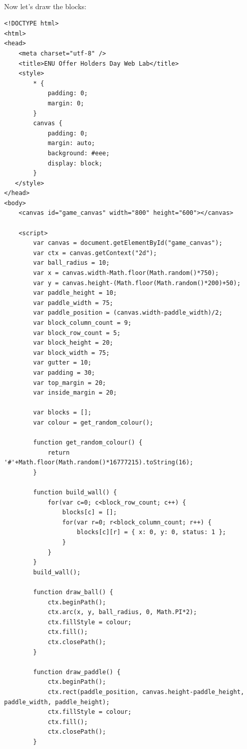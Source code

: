 \documentclass[10pt, a4paper, oneside]{article}
\begin{document}
\paragraph{} Now let's draw the blocks:

\begin{lstlisting}
<!DOCTYPE html>
<html>
<head>
    <meta charset="utf-8" />
    <title>ENU Offer Holders Day Web Lab</title>
    <style>
        * { 
            padding: 0; 
            margin: 0; 
        } 
        canvas { 
            padding: 0; 
            margin: auto; 
            background: #eee; 
            display: block; 
        }
   </style>
</head>
<body>
    <canvas id="game_canvas" width="800" height="600"></canvas>

    <script>
        var canvas = document.getElementById("game_canvas");
        var ctx = canvas.getContext("2d");
        var ball_radius = 10;
        var x = canvas.width-Math.floor(Math.random()*750);
        var y = canvas.height-(Math.floor(Math.random()*200)+50);
        var paddle_height = 10;
        var paddle_width = 75;
        var paddle_position = (canvas.width-paddle_width)/2;
        var block_column_count = 9;
        var block_row_count = 5;
        var block_height = 20;
        var block_width = 75;
        var gutter = 10;
        var padding = 30;
        var top_margin = 20;
        var inside_margin = 20;

        var blocks = [];
        var colour = get_random_colour();

        function get_random_colour() {
            return '#'+Math.floor(Math.random()*16777215).toString(16);
        }

        function build_wall() {
            for(var c=0; c<block_row_count; c++) {
                blocks[c] = [];
                for(var r=0; r<block_column_count; r++) {
                    blocks[c][r] = { x: 0, y: 0, status: 1 };
                }
            }
        }
        build_wall();
  
        function draw_ball() {
            ctx.beginPath();
            ctx.arc(x, y, ball_radius, 0, Math.PI*2);
            ctx.fillStyle = colour;
            ctx.fill();
            ctx.closePath();
        }

        function draw_paddle() {
            ctx.beginPath();
            ctx.rect(paddle_position, canvas.height-paddle_height, paddle_width, paddle_height);
            ctx.fillStyle = colour;
            ctx.fill();
            ctx.closePath();
        }


\end{lstlisting}
\end{document}
